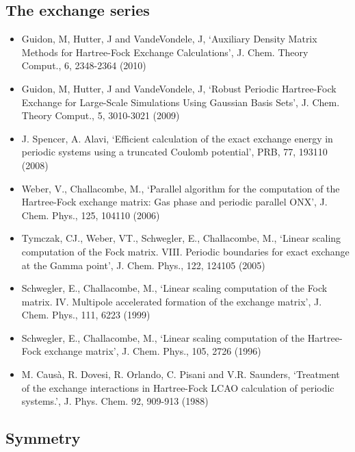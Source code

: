 \documentclass{report}
\begin{document}
\subsection{The exchange series}
\begin{itemize}
\item Guidon, M, Hutter, J and VandeVondele, J, `Auxiliary Density Matrix Methods for Hartree-Fock Exchange Calculations', J. Chem. Theory Comput., 6, 2348-2364 (2010)

\item Guidon, M, Hutter, J and VandeVondele, J, `Robust Periodic Hartree-Fock Exchange for Large-Scale Simulations Using Gaussian Basis Sets', J. Chem. Theory Comput., 5, 3010-3021 (2009)

\item J. Spencer, A. Alavi, `Efficient calculation of the exact exchange energy in periodic systems using a truncated Coulomb potential', PRB, 77, 193110 (2008)

\item Weber, V., Challacombe, M., `Parallel algorithm for the computation of the Hartree-Fock exchange matrix: Gas phase and periodic parallel ONX', J. Chem. Phys., 125, 104110 (2006)

\item Tymczak, CJ., Weber, VT., Schwegler, E., Challacombe, M., `Linear scaling computation of the Fock matrix. VIII. Periodic boundaries for exact exchange at the Gamma point', J. Chem. Phys., 122, 124105 (2005)

\item Schwegler, E., Challacombe, M., `Linear scaling computation of the Fock matrix. IV. Multipole accelerated formation of the exchange matrix', J. Chem. Phys., 111, 6223 (1999)

\item Schwegler, E., Challacombe, M., `Linear scaling computation of the Hartree-Fock exchange matrix', J. Chem. Phys., 105, 2726 (1996)

\item M. Causà, R. Dovesi, R. Orlando, C. Pisani and V.R. Saunders, `Treatment of the exchange interactions in Hartree-Fock LCAO calculation of periodic systems.', J. Phys. Chem. 92, 909-913 (1988)
\end{itemize}

\subsection{Symmetry}
\end{document}
